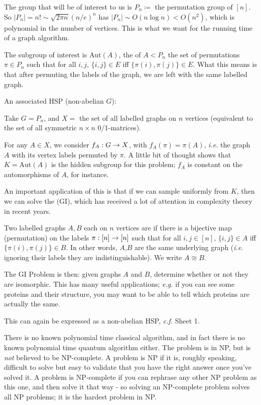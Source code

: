 \documentclass[]{article}
\renewcommand{\it}[1]{\textit{#1}}
\begin{document}
\begin{remark*}
\begin{enumerate}[label = (\alph*)]
	The group that will be of interest to us is $P_n \coloneqq$ the permutation group of $[n]$. So $|P_n| = n! \sim \sqrt{2\pi n}(n/e)^n$ has $|P_n|\sim O(n\log n) < O(n^2)$, which is polynomial in the number of vertices. This is what we want for the running time of a graph algorithm.
	
	The subgroup of interest is $\textrm{Aut}(A)$, the  of $A < P_n$ the set of permutations $\pi \in P_n$ such that for all $i,j$, $\{i,j\}\in E$ iff $\{\pi(i),\pi(j)\}\in E$. What this means is that after permuting the labels of the graph, we are left with the same labelled graph.
	
	An associated HSP (non-abelian $G$):
	
	Take $G = P_n$, and $X = $ the set of all labelled graphs on $n$ vertices (equivalent to the set of all symmetric $n\times n$ 0/1-matrices).
	
	For any $A\in X$, we consider $f_A : G\rightarrow X$, with $f_A(\pi) = \pi(A)$, \it{i.e.} the graph $A$ with its vertex labels permuted by $\pi$. A little bit of thought shows that $K = \textrm{Aut}(A)$ is the hidden subgroup for this problem; $f_A$ is constant on the automorphisms of $A$, for instance.
	
	An important application of this is that if we can sample uniformly from $K$, then we can solve the  (GI), which has received a lot of attention in complexity theory in recent years.
	
	Two labelled graphs $A,B$ each on $n$ vertices are  if there is a bijective map (permutation) on the labels $\pi :[n]\rightarrow[n]$ such that for all $i,j\in [n]$, $\{i,j\}\in A$ iff $\{\pi(i),\pi(j)\}\in B$. In other words, $A$,$B$ are the same underlying graph (\it{i.e.} ignoring their labels they are indistinguishable). We write $A\cong B$.
	
	The GI Problem is then: given graphs $A$ and $B$, determine whether or not they are isomorphic. This has many useful applications; \it{e.g.} if you can see some proteins and their structure, you may want to be able to tell which proteins are actually the same.
	
	This can again be expressed as a non-abelian HSP, \it{c.f.} Sheet 1.
	
	There is no known polynomial time classical algorithm, and in fact there is no known polynomial time quantum algorithm either. The problem is in NP, but is \it{not} believed to be NP-complete. A problem is NP if it is, roughly speaking, difficult to solve but easy to validate that you have the right answer once you've solved it. A problem is NP-complete if you can rephrase any other NP problem as this one, and then solve it that way - so solving an NP-complete problem solves all NP problems; it is the hardest problem in NP.
	

\end{enumerate}
\end{remark*}
\end{document}
